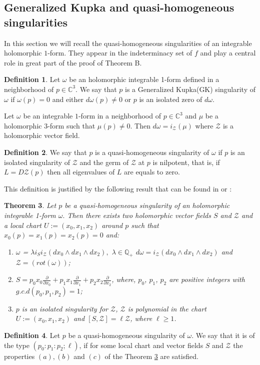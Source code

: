 \documentclass{amsart}
\newtheorem{theorem}{Theorem}[section]
\theoremstyle{definition}
\newtheorem{definition}[theorem]{Definition}
\theoremstyle{proposition}
\numberwithin{equation}{section}
\theoremstyle{main}
\begin{document}
\subsection{Generalized Kupka and quasi-homogeneous singularities}\label{section5.2}
 In this section we will recall the quasi-homogeneous singularities of an  integrable holomorphic $1$-form.  They appear in the indeterminacy set of $f$ and play a central role in great part of the proof of Theorem  B. 
\begin{definition} Let  $\omega$ be an holomorphic  integrable 1-form defined in a neighborhood of $p \in {\mathbb{C}^3}$. We say that $p$ is a Generalized Kupka(GK) singularity of $\omega$ if $\omega(p)=0$ and either 
$d\omega(p)\neq0$ or $p$ is an isolated zero of $d\omega$.   
\end{definition}
 \par
Let $\omega$ be an integrable $1$-form in a neighborhood of $p  \in {\mathbb{C}^3}$  and $\mu$ be a holomorphic $3$-form such that $\mu({p}) \neq 0$. Then $d\omega=i_{\mathcal Z}(\mu)$ where $\mathcal Z$ is a holomorphic vector field. 
\begin{definition} We say that $p$ is a quasi-homogeneous singularity of $\omega$ if  $p$ is an isolated singularity of $\mathcal Z$ and the germ of $\mathcal Z$ at $p$ is nilpotent, that is, if $L=D\mathcal Z(p)$ then all eigenvalues of $L$ are equals to zero.
\end{definition}
 This definition is justified by the following result that can be found in \cite{ln1} or \cite{ccgl}:
\begin{theorem} \label{teo5.3}
Let $p$ be a quasi-homogeneous singularity of an holomorphic integrable 1-form $\omega.$  Then there exists two holomorphic vector fields $S$ and $\mathcal Z$ and a local chart  $U:=(x_{0},x_{1},x_{2})$  around $p$ such that  $x_{0}(p)=x_{1}(p)=x_{2}(p)=0$ and:
\begin{enumerate}
\item[(a)] $\omega$ = $\lambda i_{S}i_{\mathcal Z}(dx_0 \wedge dx_{1} \wedge dx_{2}),$ $\lambda \in \mathbb Q_{+}$ 
$d\omega= i_{\mathcal Z}(dx_{0} \wedge dx_{1} \wedge dx_{2})$ and $\mathcal Z=(rot (\omega))$;
\item[(b)] $S=p_{0}x_{0} \frac{\partial}{\partial x_{0}}+ p_{1}x_{1} \frac{\partial}{\partial x_{1}}+p_{2}x_{2} \frac{\partial}{\partial x_{2}} $, where, $p_{0}$, $p_{1}$, $p_{2}$ are positive integers with $g.c.d (p_{0},p_{1},p_{2})=1$;
\item[(c)]  $p$ is an isolated singularity for $\mathcal Z$, $\mathcal Z$ is polynomial in the chart\break $U:=(x_{0},x_{1},x_{2})$ and  $[S,\mathcal Z]=\ell \mathcal Z$, where $\ell \geq1$.
\end{enumerate}
\end{theorem}
 \begin{definition}
 Let $p$ be a quasi-homogeneous singularity of $\omega.$ We say that it is of the type $(p_{0}:p_{1}:p_{2};\ell)$, if  for some local chart and vector fields $S$ and $\mathcal Z$  the properties $(a),(b)$ and $(c)$ of the {\textrm{Theorem}} \ref{teo5.3} are satisfied.
 \end{definition}
 
\end{document}
